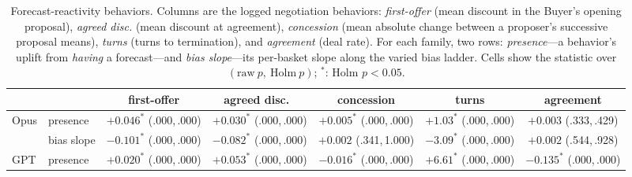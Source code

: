 \documentclass{article}
\begin{document}
\begin{table}[H]
  \caption{Forecast-reactivity behaviors. Columns are the logged negotiation behaviors: \emph{first-offer} (mean discount in the Buyer's opening proposal), \emph{agreed disc.} (mean discount at agreement), \emph{concession} (mean absolute change between a proposer's successive proposal means), \emph{turns} (turns to termination), and \emph{agreement} (deal rate). For each family, two rows: \emph{presence}---a behavior's uplift from \emph{having} a forecast---and \emph{bias slope}---its per-basket slope along the varied bias ladder. Cells show the statistic over $(\text{raw}\ p,\ \text{Holm}\ p)$; $^{*}$: Holm $p<0.05$.}
  \label{tab:reactivity}
  \centering\small\setlength{\tabcolsep}{5pt}
  \begin{tabular}{llccccc}
    \toprule
    & & first-offer & agreed disc.\ & concession & turns & agreement \\
    \midrule
    \multirow{2}{*}{Opus} & presence   & \makecell{$+0.046^{*}$\\{\scriptsize(.000,\,.000)}} & \makecell{$+0.030^{*}$\\{\scriptsize(.000,\,.000)}} & \makecell{$+0.005^{*}$\\{\scriptsize(.000,\,.000)}} & \makecell{$+1.03^{*}$\\{\scriptsize(.000,\,.000)}} & \makecell{$+0.003$\\{\scriptsize(.333,\,.429)}} \\
                          & bias slope & \makecell{$-0.101^{*}$\\{\scriptsize(.000,\,.000)}} & \makecell{$-0.082^{*}$\\{\scriptsize(.000,\,.000)}} & \makecell{$+0.002$\\{\scriptsize(.341,\,1.000)}} & \makecell{$-3.09^{*}$\\{\scriptsize(.000,\,.000)}} & \makecell{$+0.002$\\{\scriptsize(.544,\,.928)}} \\
    \cmidrule(lr){1-7}
    \multirow{2}{*}{GPT} & presence   & \makecell{$+0.020^{*}$\\{\scriptsize(.000,\,.000)}} & \makecell{$+0.053^{*}$\\{\scriptsize(.000,\,.000)}} & \makecell{$-0.016^{*}$\\{\scriptsize(.000,\,.000)}} & \makecell{$+6.61^{*}$\\{\scriptsize(.000,\,.000)}} & \makecell{$-0.135^{*}$\\{\scriptsize(.000,\,.000)}} \\

\end{tabular}
\end{table}
\end{document}
